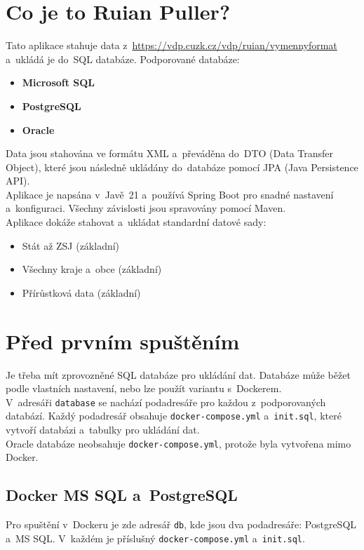\section*{Co je to Ruian Puller?}
Tato aplikace stahuje data z~\url{https://vdp.cuzk.cz/vdp/ruian/vymennyformat} a~ukládá je do~SQL databáze.  
Podporované databáze:  
\begin{itemize}
  \item \textbf{Microsoft SQL}
  \item \textbf{PostgreSQL}
  \item \textbf{Oracle}
\end{itemize}

Data jsou stahována ve formátu XML a~převáděna do~DTO (Data Transfer Object), které jsou následně ukládány do~databáze pomocí JPA (Java Persistence API).\\
Aplikace je napsána v~Javě~21 a~používá Spring Boot pro snadné nastavení a~konfiguraci. Všechny závislosti jsou spravovány pomocí Maven.\\
Aplikace dokáže stahovat a~ukládat standardní datové sady:
\begin{itemize}
  \item Stát až ZSJ (základní)
  \item Všechny kraje a~obce (základní)
  \item Přírůstková data (základní)
\end{itemize}

\section*{Před prvním spuštěním}
Je třeba mít zprovozněné SQL databáze pro ukládání dat. Databáze může běžet podle vlastních nastavení, nebo lze použít variantu s~Dockerem.\\
V~adresáři \texttt{database} se nachází podadresáře pro každou z~podporovaných databází. Každý podadresář obsahuje \texttt{docker-compose.yml} a~\texttt{init.sql}, které vytvoří databázi a~tabulky pro ukládání dat.\\
Oracle databáze neobsahuje \texttt{docker-compose.yml}, protože byla vytvořena mimo Docker.

\subsection*{Docker MS SQL a~PostgreSQL}
Pro spuštění v~Dockeru je zde adresář \texttt{db}, kde jsou dva podadresáře: PostgreSQL a~MS SQL. V~každém je příslušný \texttt{docker-compose.yml} a~\texttt{init.sql}.


